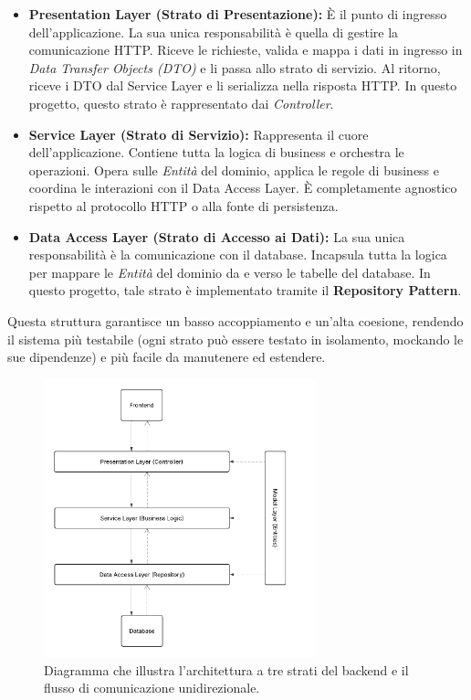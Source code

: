 \documentclass[12pt,a4paper,openright,twoside]{book}
\begin{document}
\begin{itemize}
    \item \textbf{Presentation Layer (Strato di Presentazione):} È il punto di ingresso dell'applicazione. La sua unica responsabilità è quella di gestire la comunicazione HTTP. Riceve le richieste, valida e mappa i dati in ingresso in \textit{Data Transfer Objects (DTO)} e li passa allo strato di servizio. Al ritorno, riceve i DTO dal Service Layer e li serializza nella risposta HTTP. In questo progetto, questo strato è rappresentato dai \textit{Controller}.

    \item \textbf{Service Layer (Strato di Servizio):} Rappresenta il cuore dell'applicazione. Contiene tutta la logica di business e orchestra le operazioni. Opera sulle \textit{Entità} del dominio, applica le regole di business e coordina le interazioni con il Data Access Layer. È completamente agnostico rispetto al protocollo HTTP o alla fonte di persistenza.

    \item \textbf{Data Access Layer (Strato di Accesso ai Dati):} La sua unica responsabilità è la comunicazione con il database. Incapsula tutta la logica per mappare le \textit{Entità} del dominio da e verso le tabelle del database. In questo progetto, tale strato è implementato tramite il \textbf{Repository Pattern}.
\end{itemize}

Questa struttura garantisce un basso accoppiamento e un'alta coesione, rendendo il sistema più testabile (ogni strato può essere testato in isolamento, mockando le sue dipendenze) e più facile da manutenere ed estendere.

\begin{figure}[H]
    \centering
    \includegraphics[width=0.7\textwidth]{figures/layer_design.pdf}
    \caption{Diagramma che illustra l'architettura a tre strati del backend e il flusso di comunicazione unidirezionale.}
    \label{fig:layered_architecture_uml}
\end{figure}
\end{document}
